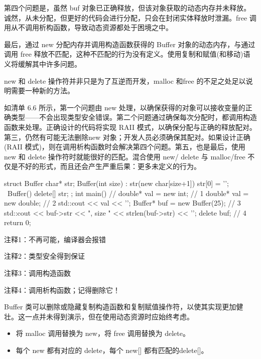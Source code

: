 第四个问题是，虽然 buf 对象已正确释放，但该对象获取的动态内存并未释放。诚然，从未分配，但更好的代码会进行分配，只会在封闭实体释放时泄漏。free 调用从不调用析构函数，导致动态资源都处于困境之中。

最后，通过 new 分配内存并调用构造函数获得的 Buffer 对象的动态内存，与通过调用 free 释放不匹配，这种不匹配的行为没有定义。使用复制和赋值(和移动)语义将缓解其中许多问题。


new 和 delete 操作符并非只是为了互逆而开发，malloc 和free 的不足之处足以说明需要一种新的方法。

如清单 6.6 所示，第一个问题由 new 处理，以确保获得的对象可以接收变量的正确类型——不会出现类型安全错误。第二个问题通过确保每次分配时，都调用构造函数来处理。正确设计的代码将实现 RAII 模式，以确保分配与正确的释放配对。第三，仍然有可能无法删除new 对象；开发人员必须确保其配对。如果设计正确(RAII 模式)，则在调用析构函数时会解决第四个问题。第五，也是最后，使用 new 和 delete 操作符时就能很好的匹配。混合使用 new/ delete 与 malloc/free 不仅是不好的形式，而且还会产生严重后果：更多未定义的行为。


\begin{cpp}
struct Buffer {
  char* str;
  Buffer(int size) : str(new char[size+1]) { str[0] = '\0'; }
  ~Buffer() { delete[] str; }
};
int main() {
  // double* val = new int; // 1
  double* val = new double; // 2
  std::cout << val << '\n';
  Buffer* buf = new Buffer(25); // 3
  std::cout << buf->str << ", size " << strlen(buf->str) << '\n';
  delete buf; // 4
  return 0;
}
\end{cpp}

{\footnotesize
注释1：不再可能，编译器会报错

注释2：类型安全得到保证

注释3：调用构造函数

注释4：调用析构函数；记得删除它！
}

Buffer 类可以删除或隐藏复制构造函数和复制赋值操作符，以使其实现更加健壮。这一点并未得到演示，但在使用动态资源时应始终考虑。


\begin{itemize}
\item
将 malloc 调用替换为 new，将 free 调用替换为 delete。

\item
每个 new 都有对应的 delete，每个 new[] 都有匹配的delete[]。
\end{itemize}
